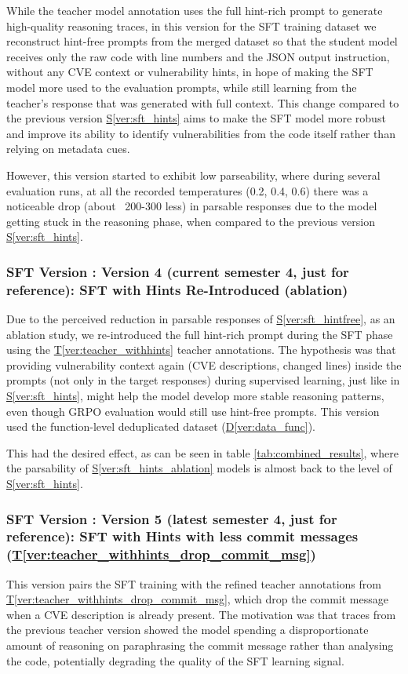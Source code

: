 \documentclass[12pt,a4paper]{article}
\makeatletter
\newcounter{SFTVer}
\newcommand{\sftversion}[2]{%
  \stepcounter{SFTVer}%
  \subsubsection{SFT Version \theSFTVer: #1}%
  \protected@edef\@currentlabel{\theSFTVer}\label{#2}%
}
\makeatother
\begin{document}
While the teacher model annotation uses the full hint-rich prompt to generate high-quality reasoning traces, in this version for the SFT training dataset we reconstruct hint-free prompts from the merged dataset so that the student model receives only the raw code with line numbers and the JSON output instruction, without any CVE context or vulnerability hints, in hope of making the SFT model more used to the evaluation prompts, while still learning from the teacher's response that was generated with full context. This change compared to the previous version \hyperref[ver:sft_hints]{S\ref*{ver:sft_hints}} aims to make the SFT model more robust and improve its ability to identify vulnerabilities from the code itself rather than relying on metadata cues.

However, this version started to exhibit low parseability, where during several evaluation runs, at all the recorded temperatures (0.2, 0.4, 0.6) there was a noticeable drop (about ~200-300 less) in parsable responses due to the model getting stuck in the reasoning phase, when compared to the previous version \hyperref[ver:sft_hints]{S\ref*{ver:sft_hints}}.

\sftversion{Version 4 (current semester 4, just for reference): SFT with Hints Re-Introduced (ablation)}{ver:sft_hints_ablation}

Due to the perceived reduction in parsable responses of \hyperref[ver:sft_hintfree]{S\ref*{ver:sft_hintfree}}, as an ablation study, we re-introduced the full hint-rich prompt during the SFT phase using the \hyperref[ver:teacher_withhints]{T\ref*{ver:teacher_withhints}} teacher annotations. The hypothesis was that providing vulnerability context again (CVE descriptions, changed lines) inside the prompts (not only in the target responses) during supervised learning, just like in \hyperref[ver:sft_hints]{S\ref*{ver:sft_hints}}, might help the model develop more stable reasoning patterns, even though GRPO evaluation would still use hint-free prompts. This version used the function-level deduplicated dataset (\hyperref[ver:data_func]{D\ref*{ver:data_func}}).

This had the desired effect, as can be seen in table \ref{tab:combined_results}, where the parsability of \hyperref[ver:sft_hints_ablation]{S\ref*{ver:sft_hints_ablation}} models is almost back to the level of \hyperref[ver:sft_hints]{S\ref*{ver:sft_hints}}.

\sftversion{Version 5 (latest semester 4, just for reference): SFT with Hints with less commit messages (\hyperref[ver:teacher_withhints_drop_commit_msg]{T\ref*{ver:teacher_withhints_drop_commit_msg}})}{ver:sft_hints_drop_commit_msg}
This version pairs the SFT training with the refined teacher annotations from \hyperref[ver:teacher_withhints_drop_commit_msg]{T\ref*{ver:teacher_withhints_drop_commit_msg}}, which drop the commit message when a CVE description is already present. The motivation was that traces from the previous teacher version showed the model spending a disproportionate amount of reasoning on paraphrasing the commit message rather than analysing the code, potentially degrading the quality of the SFT learning signal.
\end{document}
